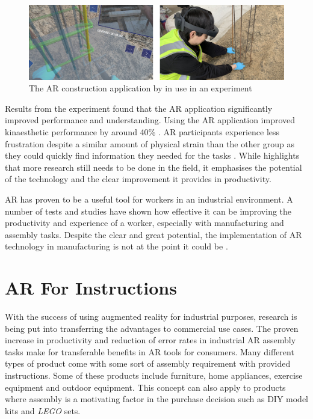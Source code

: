 \documentclass{l4proj}
\begin{document}
\begin{figure}[hbt!]
    \centering
    \includegraphics[width=0.8\linewidth]{dissertation//images/arConstruction.jpg}
    \caption{The AR construction application by \citet{wu_cognitive_2023} in use in an experiment}
    \label{fig:arConstruction}
\end{figure}

Results from the experiment found that the AR application significantly improved performance and understanding. Using the AR application improved kinaesthetic performance by around 40\% \citep{wu_cognitive_2023}. AR participants experience less frustration despite a similar amount of physical strain than the other group as they could quickly find information they needed for the tasks \citep{wu_cognitive_2023}. While \citet{wu_cognitive_2023} highlights that more research still needs to be done in the field, it emphasises the potential of the technology and the clear improvement it provides in productivity.

AR has proven to be a useful tool for workers in an industrial environment. A number of tests and studies have shown how effective it can be improving the productivity and experience of a worker, especially with manufacturing and assembly tasks. Despite the clear and great potential, the implementation of AR technology in manufacturing is not at the point it could be \citep{jalo_state_2021}.

\section{AR For Instructions}

With the success of using augmented reality for industrial purposes, research is being put into transferring the advantages to commercial use cases. The proven increase in productivity and reduction of error rates in industrial AR assembly tasks make for transferable benefits in AR tools for consumers. Many different types of product come with some sort of assembly requirement with provided instructions. Some of these products include furniture, home appliances, exercise equipment and outdoor equipment. This concept can also apply to products where assembly is a motivating factor in the purchase decision such as DIY model kits and \textit{LEGO} sets.
\end{document}
